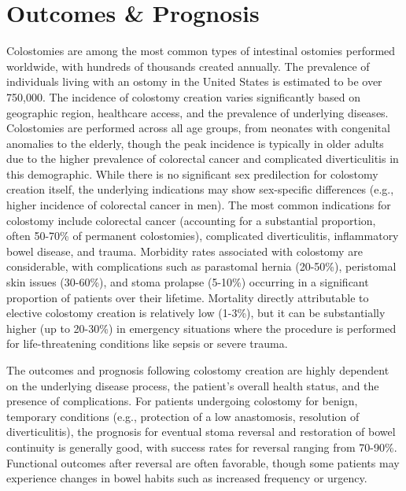 \section*{Outcomes \& Prognosis}
Colostomies are among the most common types of intestinal ostomies performed worldwide, with hundreds of thousands created annually. The prevalence of individuals living with an ostomy in the United States is estimated to be over 750,000. The incidence of colostomy creation varies significantly based on geographic region, healthcare access, and the prevalence of underlying diseases. Colostomies are performed across all age groups, from neonates with congenital anomalies to the elderly, though the peak incidence is typically in older adults due to the higher prevalence of colorectal cancer and complicated diverticulitis in this demographic. While there is no significant sex predilection for colostomy creation itself, the underlying indications may show sex-specific differences (e.g., higher incidence of colorectal cancer in men). The most common indications for colostomy include colorectal cancer (accounting for a substantial proportion, often 50-70\% of permanent colostomies), complicated diverticulitis, inflammatory bowel disease, and trauma. Morbidity rates associated with colostomy are considerable, with complications such as parastomal hernia (20-50\%), peristomal skin issues (30-60\%), and stoma prolapse (5-10\%) occurring in a significant proportion of patients over their lifetime. Mortality directly attributable to elective colostomy creation is relatively low (1-3\%), but it can be substantially higher (up to 20-30\%) in emergency situations where the procedure is performed for life-threatening conditions like sepsis or severe trauma.

The outcomes and prognosis following colostomy creation are highly dependent on the underlying disease process, the patient's overall health status, and the presence of complications. For patients undergoing colostomy for benign, temporary conditions (e.g., protection of a low anastomosis, resolution of diverticulitis), the prognosis for eventual stoma reversal and restoration of bowel continuity is generally good, with success rates for reversal ranging from 70-90\%. Functional outcomes after reversal are often favorable, though some patients may experience changes in bowel habits such as increased frequency or urgency.

